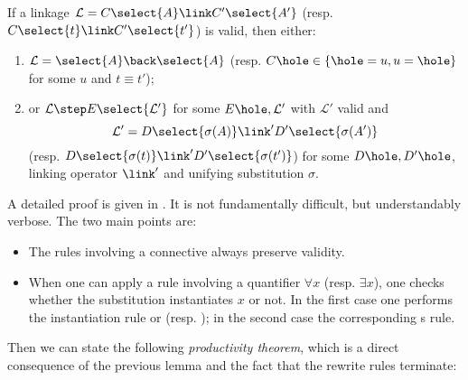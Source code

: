 \begin{lemma}\label{thm:vprogress} If a linkage $\mathcal{L} =
  C\select{A} \link C'\select{A'}$ (resp. $C\select{t} \link C'\select{t'}$) is
  valid, then either:
  \begin{enumerate}
    \item $\mathcal{L} = \select{A} \back \select{A}$ (resp. $C\hole \in \{\hole
    = u, u = \hole\}$ for some $u$ and $t \equiv t'$);
    \item or $\mathcal{L} \step E\select{\mathcal{L'}}$ for some $E\hole,
      \mathcal{L'}$ with $\mathcal{L'}$ valid and
      $$\mathcal{L'} = D\select{\sigma(A)} \link' D'\select{\sigma(A')}$$ (resp.
      $D\select{\sigma(t)} \link' D'\select{\sigma(t')}$) for some $D\hole,
      D'\hole$, linking operator $\link'$ and unifying substitution $\sigma$.
  \end{enumerate}
\end{lemma}

A detailed proof is given in . It is not fundamentally
difficult, but understandably verbose. The two main points are:
\begin{itemize}
\item The rules involving a connective always preserve validity.
\item When one can apply a rule involving a quantifier $\forall x$ (resp.
  $\exists x$), one checks whether the substitution instantiates $x$ or not. In
  the first case one performs the instantiation rule  or
   (resp. ); in the second case the
  corresponding \textsf{s} rule.
\end{itemize}


Then we can state the following \emph{productivity theorem}, which is a direct
consequence of the previous lemma and the fact that the rewrite rules
terminate:

